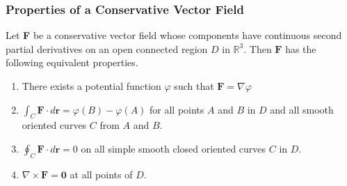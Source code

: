 \subsubsection{Properties of a Conservative Vector Field}
Let \textbf{F} be a conservative vector field whose components have continuous second partial derivatives on an open connected region $D$ in $\mathbb{R}^3$. Then $\mathbf{F}$ has the following equivalent properties.

\begin{enumerate}
    \item There exists a potential function $\varphi$ such that $\mathbf{F} = \nabla \varphi$
    \item $\int _C \mathbf{F} \cdot d\mathbf{r} = \varphi (B) - \varphi (A)$ for all points $A$ and $B$ in $D$ and all smooth oriented curves $C$ from $A$ and $B$.
    \item $\oint _C \mathbf{F} \cdot d \mathbf{r} = 0$ on all simple smooth closed oriented curves $C$ in $D$.
    \item $\nabla \times \mathbf{F} = \mathbf{0}$ at all points of $D$.
\end{enumerate}
